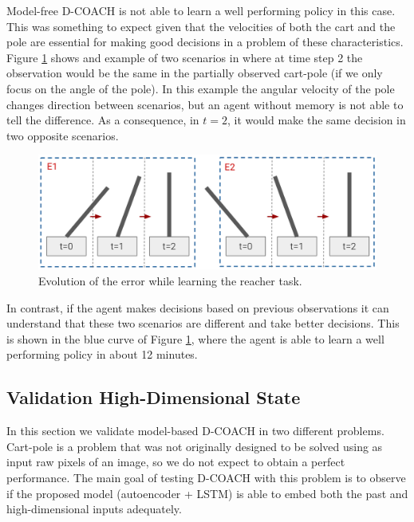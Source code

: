 Model-free D-COACH is not able to learn a well performing policy in this case. This was something to expect given that the velocities of both the cart and the pole are essential for making good decisions in a problem of these characteristics. Figure \ref{fig:cp_ex} shows and example of two scenarios in where at time step 2 the observation would be the same in the partially observed cart-pole (if we only focus on the angle of the pole). In this example the angular velocity of the pole changes direction between scenarios, but an agent without memory is not able to tell the difference. As a consequence, in $t=2$, it would make the same decision in two opposite scenarios.

\begin{figure}[h]
    \centering
    \includegraphics[width=0.9\linewidth]{imagenes/cap4/cartpole_ex.png}
    \caption{Evolution of the error while learning the reacher task. }
    \label{fig:cp_ex}
\end{figure}

In contrast, if the agent makes decisions based on previous observations it can understand that these two scenarios are different and take better decisions. This is shown in the blue curve of Figure \ref{fig:cp_ex}, where the agent is able to learn a well performing policy in about 12 minutes. 

\subsection{Validation High-Dimensional State}
In this section we validate model-based D-COACH in two different problems. Cart-pole is a problem that was not originally designed to be solved using as input raw pixels of an image, so we do not expect to obtain a perfect performance. The main goal of testing D-COACH with this problem is to observe if the proposed model (autoencoder + LSTM) is able to embed both the past and high-dimensional inputs adequately.


